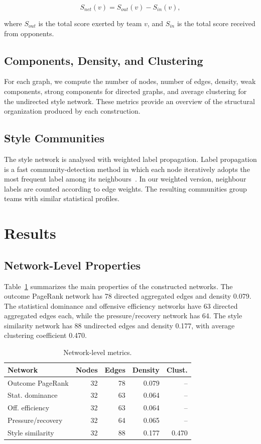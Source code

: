 \documentclass[10pt,twocolumn]{article}
\begin{document}
\[
    S_{net}(v) = S_{out}(v) - S_{in}(v),
\]

where $S_{out}$ is the total score exerted by team $v$, and $S_{in}$ is the total score received from opponents.

\subsection{Components, Density, and Clustering}

For each graph, we compute the number of nodes, number of edges, density, weak components, strong components for directed graphs, and average clustering for the undirected style network. These metrics provide an overview of the structural organization produced by each construction.

\subsection{Style Communities}

The style network is analysed with weighted label propagation. Label propagation is a fast community-detection method in which each node iteratively adopts the most frequent label among its neighbours~\cite{raghavan2007label}. In our weighted version, neighbour labels are counted according to edge weights. The resulting communities group teams with similar statistical profiles.

\section{Results}

\subsection{Network-Level Properties}

Table~\ref{tab:metrics} summarizes the main properties of the constructed networks. The outcome PageRank network has 78 directed aggregated edges and density 0.079. The statistical dominance and offensive efficiency networks have 63 directed aggregated edges each, while the pressure/recovery network has 64. The style similarity network has 88 undirected edges and density 0.177, with average clustering coefficient 0.470.

\begin{table}[t]
\centering
\caption{Network-level metrics.}
\label{tab:metrics}
\small
\begin{tabular}{lrrrr}
\toprule
Network & Nodes & Edges & Density & Clust. \\
\midrule
Outcome PageRank & 32 & 78 & 0.079 & -- \\
Stat. dominance & 32 & 63 & 0.064 & -- \\
Off. efficiency & 32 & 63 & 0.064 & -- \\
Pressure/recovery & 32 & 64 & 0.065 & -- \\
Style similarity & 32 & 88 & 0.177 & 0.470 \\
\bottomrule
\end{tabular}
\end{table}
\end{document}
